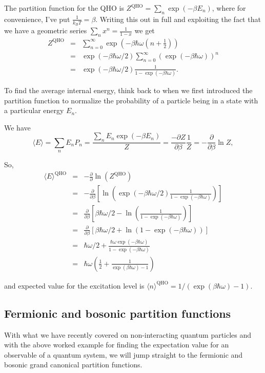 \documentclass{article}
\begin{document}
The partition function for the QHO is $Z^\text{QHO} = \sum_n\exp(-\beta E_n)$, where for convenience, I've put $\frac{1}{k_BT} = \beta$. Writing this out in full and exploiting the fact that we have a geometric series $\sum_n x^n = \frac{1}{1-x}$ we get
\begin{eqnarray*}
	Z^\text{QHO} &=& \sum_{n=0}^\infty \exp(-\beta\hbar\omega(n+\frac12))\\
	&=& \exp(-\beta\hbar\omega/2)\sum_{n=0}^\infty(\exp(-\beta\hbar\omega))^n \\
	&=& \exp(-\beta\hbar\omega/2)\frac{1}{1-\exp(-\beta\hbar\omega)}.
\end{eqnarray*}

To find the average internal energy, think back to when we first introduced the partition function to normalize the probability of a particle being in a state with a particular energy $E_n$.

We have
$$
	\langle E\rangle = \sum_n E_n P_n = \frac{\sum_n E_n \exp(-\beta E_n)}{Z} = \frac{-\partial Z}{\partial \beta}\frac{1}{Z} = -\frac{\partial}{\partial \beta}\ln{Z},
$$

So,
\begin{eqnarray*}
	\langle E\rangle^\text{QHO} &=& -\frac{\partial}{\partial}\ln(Z^\text{QHO})\\
	&=&  -\frac{\partial}{\partial\beta} \left[\ln\left( \exp(-\beta\hbar\omega/2)\frac{1}{1-\exp(-\beta\hbar\omega)}\right) \right] \\
	&=& \frac{\partial}{\partial \beta} \left[ \beta\hbar\omega/2 - \ln\left(\frac{1}{1-\exp(-\beta\hbar\omega)}\right)\right]\\
	&=& \frac{\partial}{\partial \beta} \left[ \beta\hbar\omega/2 + \ln\left({1-\exp(-\beta\hbar\omega)}\right)\right]\\
	&=& \hbar\omega/2 + \frac{\hbar\omega\exp(-\beta\hbar\omega)}{1-\exp(-\beta\hbar\omega)}\\
	&=& \hbar\omega\left(\frac12 +\frac{1}{\exp(\beta\hbar\omega)-1}\right)
\end{eqnarray*}

and expected value for the excitation level is $\langle n\rangle^\text{QHO} = 1/(\exp(\beta\hbar\omega)-1)$.

\subsection*{Fermionic and bosonic partition functions}
With what we have recently covered on non-interacting quantum particles and with the above worked example for finding the expectation value for an observable of a quantum system, we will jump straight to the fermionic and bosonic grand canonical partition functions.
\end{document}
